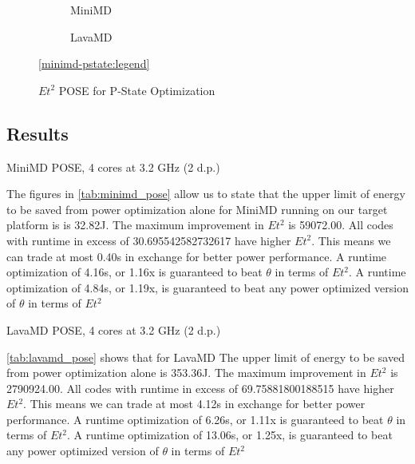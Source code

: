 \begin{figure}[t]%
\begin{subfigure}[t]{.5\linewidth}%
\centering%
%
\caption{MiniMD}%
\end{subfigure}%
\begin{subfigure}[t]{.5\linewidth}%
%
\caption{LavaMD}%
\end{subfigure}%
\begin{center}%
\ref{minimd-pstate:legend}%
\end{center}%
\caption{$Et^2$ POSE for P-State Optimization}%
\label{fig:pstates}%
\end{figure}%

\subsection{Results}

\begin{table}
\centering

\caption{MiniMD POSE, 4 cores at 3.2 GHz (2 d.p.)}
\label{tab:minimd_pose}
\end{table} 



The figures in \autoref{tab:minimd_pose} allow us to state that the upper limit of energy to be saved from power optimization alone for MiniMD running on our target platform is is 32.82J.
The maximum improvement in $Et^2$ is 59072.00.
All codes with runtime in excess of 30.695542582732617 have higher $Et^2$.
This means we can trade at most 0.40s in exchange for better power performance.
A runtime optimization of 4.16s, or 1.16x is guaranteed to beat $\theta$ in terms of $Et^2$. 
A runtime optimization of 4.84s, or 1.19x, is guaranteed to beat any power optimized version of $\theta$ in terms of $Et^2$ 


\begin{table}
\centering

\caption{LavaMD POSE, 4 cores at 3.2 GHz (2 d.p.)}
\label{tab:lavamd_pose}
\end{table} 

\autoref{tab:lavamd_pose} shows that for LavaMD The upper limit of energy to be saved from power optimization alone is 353.36J.
The maximum improvement in $Et^2$ is 2790924.00.
All codes with runtime in excess of 69.75881800188515 have higher $Et^2$.
This means we can trade at most 4.12s in exchange for better power performance.
A runtime optimization of 6.26s, or 1.11x is guaranteed to beat $\theta$ in terms of $Et^2$. 
A runtime optimization of 13.06s, or 1.25x, is guaranteed to beat any power optimized version of $\theta$ in terms of $Et^2$ 

